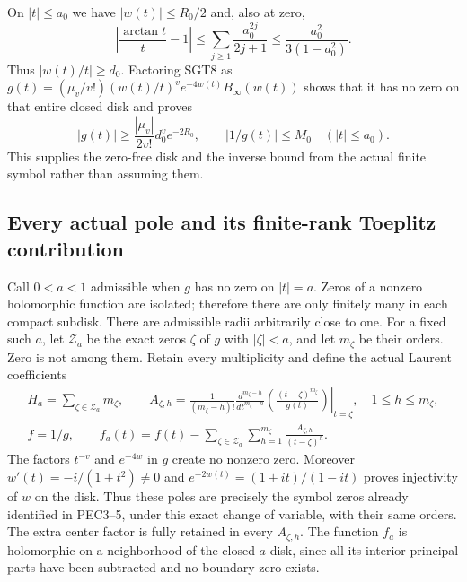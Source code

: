 \documentclass[11pt,a4paper]{article}
\begin{document}
On $|t|\le a_0$ we have $|w(t)|\le R_0/2$ and, also at zero,
\[
 \left|\frac{\arctan t}{t}-1\right|
 \le\sum_{j\ge1}\frac{a_0^{2j}}{2j+1}
 \le\frac{a_0^2}{3(1-a_0^2)}.
\]
Thus $|w(t)/t|\ge d_0$. Factoring SGT8 as
$g(t)=(\mu_v/v!)(w(t)/t)^ve^{-4w(t)}B_\infty(w(t))$
shows that it has no zero on that entire closed disk and proves
\[
 |g(t)|\ge \frac{|\mu_v|}{2v!}d_0^ve^{-2R_0},
 \qquad |1/g(t)|\le M_0 \quad(|t|\le a_0).
 \tag{SGT13}
\]
This supplies the zero-free disk and the inverse bound from the
actual finite symbol rather than assuming them.

\subsection{Every actual pole and its finite-rank Toeplitz contribution}

Call $0<a<1$ admissible when $g$ has no zero on $|t|=a$.
Zeros of a nonzero holomorphic function are isolated; therefore
there are only finitely many in each compact subdisk. There are
admissible radii arbitrarily close to one. For a fixed such $a$,
let $\mathcal Z_a$ be the exact zeros $\zeta$ of $g$ with $|\zeta|<a$,
and let $m_\zeta$ be their orders. Zero is not among them.
Retain every multiplicity and define the actual Laurent coefficients
\[
\begin{gathered}
 H_a=\sum_{\zeta\in\mathcal Z_a}m_\zeta,\qquad
 A_{\zeta,h}
 =\frac1{(m_\zeta-h)!}
  \left.\frac{d^{m_\zeta-h}}{dt^{m_\zeta-h}}
           \left(\frac{(t-\zeta)^{m_\zeta}}{g(t)}\right)
       \right|_{t=\zeta},\quad1\le h\le m_\zeta,\\
 f=1/g,\qquad
 f_a(t)=f(t)-\sum_{\zeta\in\mathcal Z_a}
                      \sum_{h=1}^{m_\zeta}\frac{A_{\zeta,h}}{(t-\zeta)^h}.
\end{gathered}\tag{SGT14}
\]
The factors $t^{-v}$ and $e^{-4w}$ in $g$ create no nonzero zero.
Moreover $w'(t)=-i/(1+t^2)\ne0$ and
$e^{-2w(t)}=(1+it)/(1-it)$ proves injectivity of $w$ on the disk.
Thus these poles are precisely the symbol zeros already identified in
PEC3--5, under this exact change of variable, with their same orders.
The extra center factor is fully retained in every $A_{\zeta,h}$.
The function $f_a$ is holomorphic on a neighborhood of the closed
$a$ disk, since all its interior principal parts have been subtracted
and no boundary zero exists.
\end{document}
